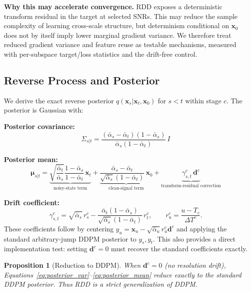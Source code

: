 \documentclass[10pt]{article}
\newtheorem{proposition}{Proposition}
\newcommand{\bx}{\bm{x}}
\newcommand{\bd}{\bm{d}}
\begin{document}
\textbf{Why this may accelerate convergence.} RDD exposes a deterministic transform residual in the target at selected SNRs. This may reduce the sample complexity of learning cross-scale structure, but determinism conditional on $\bx_0$ does not by itself imply lower marginal gradient variance. We therefore treat reduced gradient variance and feature reuse as testable mechanisms, measured with per-subspace target/loss statistics and the drift-free control.

\subsection{Reverse Process and Posterior}
\label{sec:posterior}

We derive the exact reverse posterior $q(\bx_s | \bx_t, \bx_0)$ for $s < t$ within stage $c$.
The posterior is Gaussian with:

\textbf{Posterior covariance:}
\begin{equation}
    \Sigma_{s|t} = \frac{(\bar{\alpha}_s - \bar{\alpha}_t)(1 - \bar{\alpha}_s)}{\bar{\alpha}_s(1 - \bar{\alpha}_t)}\, I
    \label{eq:posterior_var}
\end{equation}

\textbf{Posterior mean:}
\begin{equation}
    \bm{\mu}_{s|t} = \underbrace{\sqrt{\frac{\bar\alpha_t}{\bar\alpha_s}}\frac{1-\bar\alpha_s}{1-\bar\alpha_t}\,\bx_t}_{\text{noisy-state term}}
    + \underbrace{\frac{\bar\alpha_s-\bar\alpha_t}{\sqrt{\bar\alpha_s}(1-\bar\alpha_t)}\,\bx_0}_{\text{clean-signal term}}
    + \underbrace{\gamma_{s,t}^c\,\bd^c}_{\text{transform-residual correction}}
    \label{eq:posterior_mean}
\end{equation}

\textbf{Drift coefficient:}
\begin{equation}
    \gamma_{s,t}^c
    = \sqrt{\bar\alpha_s}\,r_s^c
    - \frac{\bar\alpha_t(1-\bar\alpha_s)}{\sqrt{\bar\alpha_s}(1-\bar\alpha_t)}\,r_t^c,
    \qquad r_u^c=\frac{u-T_c}{\Delta T^c}.
    \label{eq:drift_coeff}
\end{equation}
These coefficients follow by centering $y_u=\bx_u-\sqrt{\bar\alpha_u}r_u^c\bd^c$ and applying the standard arbitrary-jump DDPM posterior to $y_s,y_t$. This also provides a direct implementation test: setting $\bd^c=0$ must recover the standard coefficients exactly.

\begin{proposition}[Reduction to DDPM]
When $\bd^c = 0$ (no resolution drift), Equations~\eqref{eq:posterior_var}--\eqref{eq:posterior_mean} reduce exactly to the standard DDPM posterior. Thus RDD is a strict generalization of DDPM.
\end{proposition}
\end{document}

